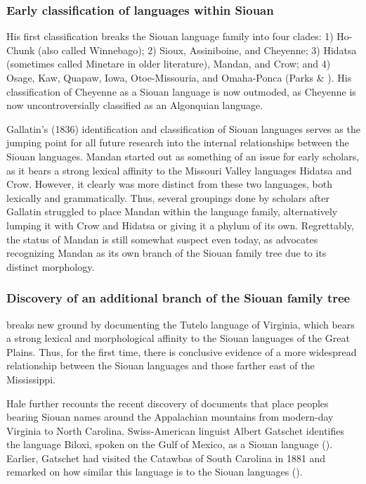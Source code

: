\documentclass[output=paper]{LSP/langsci}
\begin{document}
\subsubsection{Early classification of languages within Siouan}

His first classification breaks the Siouan language family into four clades: 1) Ho-Chunk (also called Winnebago); 2) Sioux, Assiniboine, and Cheyenne; 3) Hidatsa (sometimes called Minetare in older literature), Mandan, and Crow; and 4) Osage, Kaw, Quapaw, Iowa, Otoe-Missouria, and Omaha-Ponca (Parks \& \citealt{Rankin2001}). His classification of Cheyenne as a Siouan language is now outmoded, as Cheyenne is now uncontroversially classified as an Algonquian language.

Gallatin's (1836) identification and classification of Siouan languages serves as the jumping point for all future research into the internal relationships between the Siouan languages. Mandan started out as something of an issue for early scholars, as it bears a strong lexical affinity to the Missouri Valley languages Hidatsa and Crow. However, it clearly was more distinct from these two languages, both lexically and grammatically. Thus, several groupings done by scholars after Gallatin struggled to place Mandan within the language family, alternatively lumping it with Crow and Hidatsa or giving it a phylum of its own. Regrettably, the status of Mandan is still somewhat suspect even today, as \citet{Rankin2010} advocates recognizing Mandan as its own branch of the Siouan family tree due to its distinct morphology.

\subsubsection{Discovery of an additional branch of the Siouan family tree} \citet{Hale1883} breaks new ground by documenting the Tutelo language of Virginia, which bears a strong lexical and morphological affinity to the Siouan languages of the Great Plains. Thus, for the first time, there is conclusive evidence of a more widespread relationship between the Siouan languages and those farther east of the Mississippi. 

Hale further recounts the recent discovery of documents that place peoples bearing Siouan names around the Appalachian mountains from modern-day Virginia to North Carolina. Swiss-American linguist Albert Gatschet identifies the language Biloxi, spoken on the Gulf of Mexico, as a Siouan language (\citealt{Dorsey1894}). Earlier, Gatschet had visited the Catawbas of South Carolina in 1881 and remarked on how similar this language is to the Siouan languages (\citealt{Gatschet1900}). 
\end{document}
